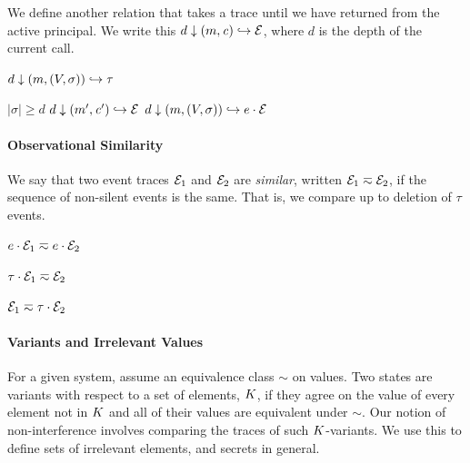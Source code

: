 \documentclass[10pt,conference]{ieeetran}%
\theoremstyle{definition}
\begin{document}
We define another relation that takes a trace until we have returned from the
active principal.
We write this \(d \downarrow (m,\mathit{c}) \hookrightarrow \mathcal{E}\), where
\(d\) is the depth of the current call.

         {\(d \downarrow (m,(V,\sigma)) \hookrightarrow \tau\)}

                  {\(|\sigma| \geq d\)}
                  {\(d \downarrow (m',\mathit{c}') \hookrightarrow \mathcal{E}\)}
                  {\(d \downarrow (m,(V,\sigma)) \hookrightarrow e \cdot \mathcal{E}\)}

\paragraph*{Observational Similarity}

We say that two event traces $\mathcal{E}_1$ and $\mathcal{E}_2$ are {\em similar},
written \(\mathcal{E}_1 \eqsim \mathcal{E}_2\), if the sequence of non-silent events
is the same. That is, we compare up to deletion of \(\tau\) events.

\begin{minipage}{.4\columnwidth}
  \judgment{}{\(\obsT \eqsim \obsT\)}
\end{minipage}
\begin{minipage}{.4\columnwidth}
           {\(e \cdot \mathcal{E}_1 \eqsim e \cdot \mathcal{E}_2\)}
\end{minipage}

\begin{minipage}{.4\columnwidth}
           {\(\tau \cdot \mathcal{E}_1 \eqsim \mathcal{E}_2\)}
\end{minipage}
\begin{minipage}{.4\columnwidth}
           {\(\mathcal{E}_1 \eqsim \tau \cdot \mathcal{E}_2\)}
\end{minipage}

\paragraph*{Variants and Irrelevant Values}

For a given system, assume an equivalence class \(\sim\) on values.
Two states are variants with respect to a set of elements, \(K\),
if they agree on the value of every element not in \(K\) and
all of their values are equivalent under \(\sim\).
Our notion of non-interference involves comparing the traces of such
\(K\)-variants. We use this to define sets of irrelevant elements,
and secrets in general.
\end{document}
